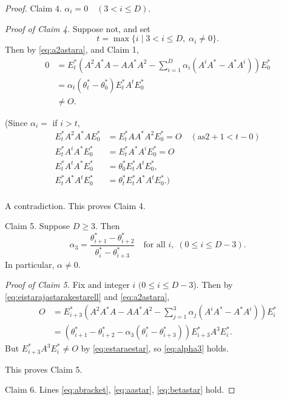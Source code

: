 \documentclass[
]{book}
\theoremstyle{definition}
\theoremstyle{definition}
\theoremstyle{definition}
\theoremstyle{definition}
\theoremstyle{remark}
\begin{document}
\begin{proof}
Claim 4. \(\alpha_i = 0 \quad (3<i\leq D)\).

\emph{Proof of Claim 4.}
Suppose not, and set
\[t = \max\{i\mid 3<i\leq D, \; \alpha_i\neq 0\}.\]
Then by \eqref{eq:a2astara}, and Claim 1,
\begin{align}
0 & = E^*_t\left(A^2A^*A - AA^*A^2 - \sum_{i=1}^D\alpha_i(A^iA^*-A^*A^i)\right)E^*_0\\
& = \alpha_t(\theta^*_t-\theta^*_0)E^*_tA^tE^*_0\\
& \neq O.
\end{align}

(Since \(\alpha_i=\) if \(i>t\),
\begin{align}
E^*_tA^2A^*AE^*_0 & = E^*_tAA^*A^2E^*_0 = O \quad (\text{as} 2+1 < t-0)\\
E^*_tA^iA^*E^*_0 & = E^*_tA^*A^iE^*_0 = O\\
E^*_tA^tA^*E^*_0 & = \theta^*_0 E^*_tA^tE^*_0,\\
E^*_tA^*A^tE^*_0 & = \theta^*_tE^*_tA^*A^tE^*_0.)\\
\end{align}

A contradiction. This proves Claim 4.

Claim 5. Suppose \(D\geq 3\). Then
\begin{equation}
\alpha_3 = \frac{\theta^*_{i+1}-\theta^*_{i+2}}{\theta^*_i - \theta^*_{i+3}} \quad \text{for all }i, \; (0\leq i\leq D-3). \label{eq:alpha3}
\end{equation}
In particular, \(\alpha\neq 0\).

\emph{Proof of Claim 5.}
Fix and integer \(i\) \((0\leq i\leq D-3\)). Then
by \eqref{eq:eistarajastarakestarell} and \eqref{eq:a2astara},
\begin{align}
O & = E^*_{i+3}\left(A^2A^*A - AA^*A^2 - \sum_{j=1}^3\alpha_j(A^iA^*-A^*A^i)\right)E^*_i\\
& = (\theta^*_{i+1}-\theta^*_{i+2}-\alpha_3(\theta^*_i-\theta^*_{i+3}))E^*_{i+3}A^3E^*_i.
\end{align}
But \(E^*_{i+3}A^3E^*_i\neq O\) by \eqref{eq:estaraestar}, so \eqref{eq:alpha3} holds.

This proves Claim 5.

Claim 6. Lines \eqref{eq:abracket}, \eqref{eq:aastar}, \eqref{eq:betastar} hold.


\end{proof}
\end{document}
